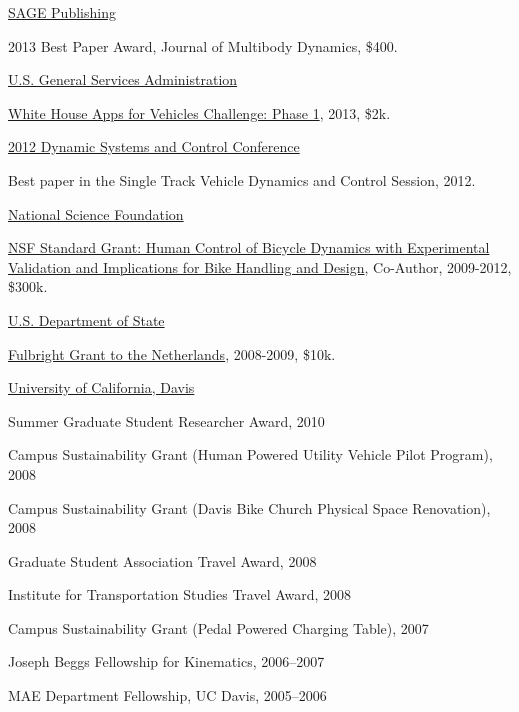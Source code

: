\documentclass[10pt]{article}
\newenvironment{innerlist}[1][\enskip\textbullet]%
        {\begin{compactitem}[#1]}{\end{compactitem}}
\newcommand{\blankline}{\quad\pagebreak[2]}
\begin{document}
\blankline

\href{http://sagepub.com/}{SAGE Publishing}
\begin{innerlist}
  \item 2013 Best Paper Award, Journal of Multibody Dynamics, \$400.
\end{innerlist}

\blankline

\href{http://gsa.gov/}{U.S. General Services Administration}
\begin{innerlist}
  \item \href{http://appsforvehicles.challenge.gov/}{White House Apps for
    Vehicles Challenge: Phase 1}, 2013, \$2k.
\end{innerlist}

\blankline

\href{http://mne.psu.edu/dscc2012/}{2012 Dynamic Systems and Control Conference}
\begin{innerlist}
  \item Best paper in the Single Track Vehicle Dynamics and Control Session,
    2012.
\end{innerlist}

\blankline

\href{http://nsf.gov/}{National Science Foundation}
\begin{innerlist}
  \item \href{http://nsf.gov/awardsearch/showAward.do?AwardNumber=0928339}{NSF
    Standard Grant: Human Control of Bicycle Dynamics with Experimental
    Validation and Implications for Bike Handling and Design}, Co-Author,
    2009-2012, \$300k.
\end{innerlist}

\blankline

\href{http://exchanges.state.gov/}{U.S. Department of State}
\begin{innerlist}
  \item \href{http://fulbright.state.gov/}{Fulbright Grant to the Netherlands},
    2008-2009, \$10k.
\end{innerlist}

\blankline

\href{http://www.ucdavis.edu}{University of California, Davis}
\begin{innerlist}
  \item Summer Graduate Student Researcher Award, 2010
  \item Campus Sustainability Grant (Human Powered Utility Vehicle Pilot Program), 2008
  \item Campus Sustainability Grant (Davis Bike Church Physical Space Renovation), 2008
  \item Graduate Student Association Travel Award, 2008
  \item Institute for Transportation Studies Travel Award, 2008
  \item Campus Sustainability Grant (Pedal Powered Charging Table), 2007
  \item Joseph Beggs Fellowship for Kinematics, 2006--2007
  \item MAE Department Fellowship, UC Davis, 2005--2006
\end{innerlist}
\end{document}

